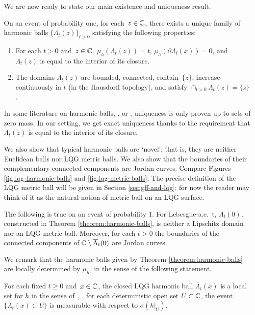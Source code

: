 \documentclass[12pt]{amsart}
\numberwithin{equation}{section}
\begin{document}
	
	
	We are now ready to state our main existence and uniqueness result. 
	
	\begin{theorem} \label{theorem:harmonic-balls}
		On an event of probability one, for each~$z \in \mathbb{C}$, there exists a unique family of harmonic balls $\{\Lambda_t(z)\}_{t > 0}$
		satisfying the following properties:
		\begin{enumerate}[label=(\alph*)]
			\item For each $t > 0$ and~$z\in\mathbb{C}$, $\mu_h(\Lambda_t(z)) = t$, $\mu_h(\partial \Lambda_t(x)) = 0$, and $\Lambda_t(z)$ is equal to the interior of its closure.
			\item The domains $\Lambda_t(z)$ are bounded, connected, contain~$\{z\}$, increase continuously in $t$ (in the Hausdorff topology), and satisfy $\cap_{t > 0} \Lambda_t(z) = \{z\}$.
		\end{enumerate}
	\end{theorem}
	In some literature on harmonic balls, \eg, \cite{sakai1984solutions} or \cite{hedenmalm2002hele}, uniqueness is only proven up to sets of zero mass. In our setting, we get exact uniqueness thanks to the requirement that $\Lambda_t(z)$ is equal to the interior of its closure.
	
	We also show that typical harmonic balls are `novel'; that is, they are 
	neither Euclidean balls nor LQG metric balls. We also show that the boundaries of their complementary connected components are Jordan curves. Compare Figures \ref{fig:lqg-harmonic-balls} and \ref{fig:lqg-metric-balls}. 
	The precise definition of the LQG metric ball will be given in Section \ref{sec:gff-and-lqg}; for now the reader may think of 
	it as the natural notion of metric ball on an LQG surface. 
	
	
	
	
	\begin{theorem} \label{theorem:harmonic-balls-properties}
		The following is true on an event of probability 1. For Lebesgue-a.e.\ t, $\Lambda_t(0)$, constructed in Theorem \ref{theorem:harmonic-balls}, 
		is neither a Lipschitz domain nor an LQG-metric ball. Moreover, for each $t>0$ the boundaries of the connected components of $\mathbb{C}\setminus \overline{\Lambda}_t(0)$ are Jordan curves. 
	\end{theorem}
	
	
	
	
	We remark that the harmonic balls given by Theorem \ref{theorem:harmonic-balls} are locally determined by $\mu_h$, in the sense of the following statement. 	
	\begin{prop} \label{prop:locally-determined}
		For each fixed $t\geq 0$ and~$x \in \mathbb{C}$, the closed LQG harmonic ball $\overline{\Lambda}_t(x)$ is a local set for $h$ in the sense of~\cite[Lemma 3.9]{ss-contour}, \ie, for each deterministic open set $U\subset\mathbb{C}$, the event $\{\overline{\Lambda}_t(x) \subset U\}$ is measurable with respect to $\sigma(h|_U)$.
	\end{prop}
	
\end{document}
